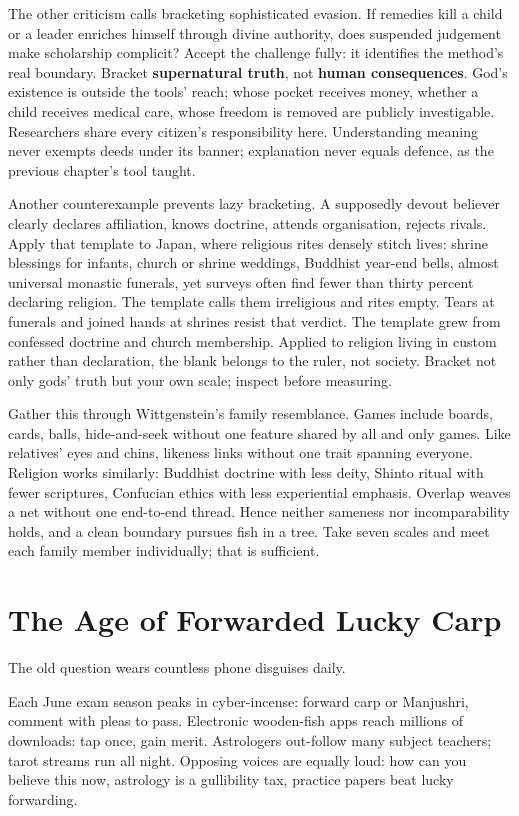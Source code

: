 The other criticism calls bracketing sophisticated evasion. If remedies kill a child or a leader enriches himself through divine authority, does suspended judgement make scholarship complicit? Accept the challenge fully: it identifies the method's real boundary. Bracket \textbf{supernatural truth}, not \textbf{human consequences}. God's existence is outside the tools' reach; whose pocket receives money, whether a child receives medical care, whose freedom is removed are publicly investigable. Researchers share every citizen's responsibility here. Understanding meaning never exempts deeds under its banner; explanation never equals defence, as the previous chapter's tool taught.

Another counterexample prevents lazy bracketing. A supposedly devout believer clearly declares affiliation, knows doctrine, attends organisation, rejects rivals. Apply that template to Japan, where religious rites densely stitch lives: shrine blessings for infants, church or shrine weddings, Buddhist year-end bells, almost universal monastic funerals, yet surveys often find fewer than thirty percent declaring religion. The template calls them irreligious and rites empty. Tears at funerals and joined hands at shrines resist that verdict. The template grew from confessed doctrine and church membership. Applied to religion living in custom rather than declaration, the blank belongs to the ruler, not society. Bracket not only gods' truth but your own scale; inspect before measuring.

Gather this through Wittgenstein's family resemblance. Games include boards, cards, balls, hide-and-seek without one feature shared by all and only games. Like relatives' eyes and chins, likeness links without one trait spanning everyone. Religion works similarly: Buddhist doctrine with less deity, Shinto ritual with fewer scriptures, Confucian ethics with less experiential emphasis. Overlap weaves a net without one end-to-end thread. Hence neither sameness nor incomparability holds, and a clean boundary pursues fish in a tree. Take seven scales and meet each family member individually; that is sufficient.

\section{The Age of Forwarded Lucky Carp}
The old question wears countless phone disguises daily.

Each June exam season peaks in cyber-incense: forward carp or Manjushri, comment with pleas to pass. Electronic wooden-fish apps reach millions of downloads: tap once, gain merit. Astrologers out-follow many subject teachers; tarot streams run all night. Opposing voices are equally loud: how can you believe this now, astrology is a gullibility tax, practice papers beat lucky forwarding.

